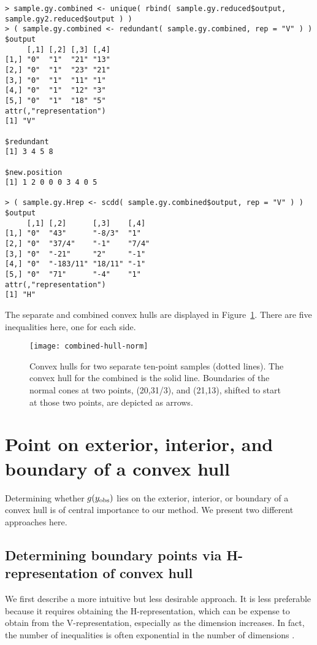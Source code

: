 \begin{verbatim}
> sample.gy.combined <- unique( rbind( sample.gy.reduced$output, 
sample.gy2.reduced$output ) )
> ( sample.gy.combined <- redundant( sample.gy.combined, rep = "V" ) )
$output
     [,1] [,2] [,3] [,4]
[1,] "0"  "1"  "21" "13"
[2,] "0"  "1"  "23" "21"
[3,] "0"  "1"  "11" "1" 
[4,] "0"  "1"  "12" "3" 
[5,] "0"  "1"  "18" "5" 
attr(,"representation")
[1] "V"

$redundant
[1] 3 4 5 8

$new.position
[1] 1 2 0 0 0 3 4 0 5

> ( sample.gy.Hrep <- scdd( sample.gy.combined$output, rep = "V" ) )
$output
     [,1] [,2]      [,3]    [,4] 
[1,] "0"  "43"      "-8/3"  "1"  
[2,] "0"  "37/4"    "-1"    "7/4"
[3,] "0"  "-21"     "2"     "-1" 
[4,] "0"  "-183/11" "18/11" "-1" 
[5,] "0"  "71"      "-4"    "1"  
attr(,"representation")
[1] "H"
\end{verbatim}

The separate and combined convex hulls are displayed in Figure~\ref{F:combined-hull}.
There are five inequalities here, one for each side.
\begin{figure}[h]
\begin{center}
\texttt{[image: combined-hull-norm]}
\end{center}
\caption[Convex hulls for two separate ten-point samples]
{Convex hulls for two separate ten-point samples (dotted lines).  The 
convex hull for the combined is the solid line.  Boundaries of the normal cones
at two points, (20,31/3), and (21,13), shifted to start at those two points, are depicted as arrows.}
\label{F:combined-hull}
\end{figure}


\section{Point on exterior, interior, and boundary of a convex hull}
Determining whether $g(y_{\text{obs}})$ lies on the exterior, interior, or boundary
of a convex hull is of central importance to our method.  We present two 
different approaches here.

\subsection{Determining boundary points via H-representation of convex hull}
\label{S:H-rep inquiry}
We first describe a more intuitive but less desirable approach.  It is less preferable because it requires obtaining the H-representation, 
which can be expense to obtain from the V-representation, 
especially as the dimension increases.  In fact, the number of inequalities 
is often exponential in the number of dimensions \citep{Fukuda:2008}.

